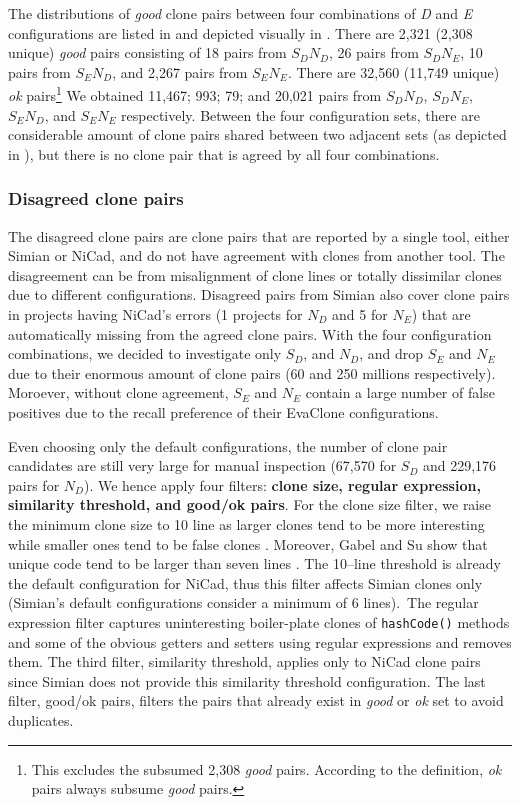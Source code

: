 \documentclass{sig-alternate-05-2015}
\begin{document}
The distributions of \textit{good} clone pairs between four combinations of \textit{D} and \textit{E} configurations are listed in  and depicted visually in . There are 2,321 (2,308 unique) \textit{good} pairs consisting of 18 pairs from $S_DN_D$, 26 pairs from $S_DN_E$, 10 pairs from $S_EN_D$, and 2,267 pairs from $S_EN_E$. There are 32,560 (11,749 unique) \textit{ok} pairs\footnote{This excludes the subsumed 2,308 \textit{good} pairs. According to the definition, \textit{ok} pairs always subsume \textit{good} pairs.} We obtained 11,467; 993; 79; and 20,021 pairs from $S_DN_D$, $S_DN_E$, $S_EN_D$, and $S_EN_E$ respectively. Between the four configuration sets, there are considerable amount of clone pairs shared between two adjacent sets (as depicted in ), but there is no clone pair that is agreed by all four combinations. 

\subsubsection{Disagreed clone pairs}

The disagreed clone pairs are clone pairs that are reported by a single tool, either Simian or NiCad, and do not have agreement with clones from another tool. The disagreement can be from misalignment of clone lines or totally dissimilar clones due to different configurations. Disagreed pairs from Simian also cover clone pairs in projects having NiCad's errors (1 projects for $N_D$ and 5 for $N_E$) that are automatically missing from the agreed clone pairs. With the four configuration combinations, we decided to investigate only $S_D$, and $N_D$, and drop $S_E$ and $N_E$ due to their enormous amount of clone pairs (60 and 250 millions respectively). Moroever, without clone agreement, $S_E$ and $N_E$ contain a large number of false positives due to the recall preference of their EvaClone configurations. 

Even choosing only the default configurations, the number of clone pair candidates are still very large for manual inspection (67,570 for $S_D$ and 229,176 pairs for $N_D$). We hence apply four filters: \textbf{clone size, regular expression, similarity threshold, and good/ok pairs}. For the clone size filter, we raise the minimum clone size to 10 line as larger clones tend to be more interesting while smaller ones tend to be false clones \cite{Saini2016}. Moreover, Gabel and Su show that unique code tend to be larger than seven lines \cite{Gabel2010}. The 10--line threshold is already the default configuration for NiCad, thus this filter affects Simian clones only (Simian's default configurations consider a minimum of 6 lines).~The regular expression filter captures uninteresting boiler-plate clones of \verb|hashCode()| methods and some of the obvious getters and setters using regular expressions and removes them. The third filter, similarity threshold, applies only to NiCad clone pairs since Simian does not provide this similarity threshold configuration. The last filter, good/ok pairs, filters the pairs that already exist in \textit{good} or \textit{ok} set to avoid duplicates. 
\end{document}
